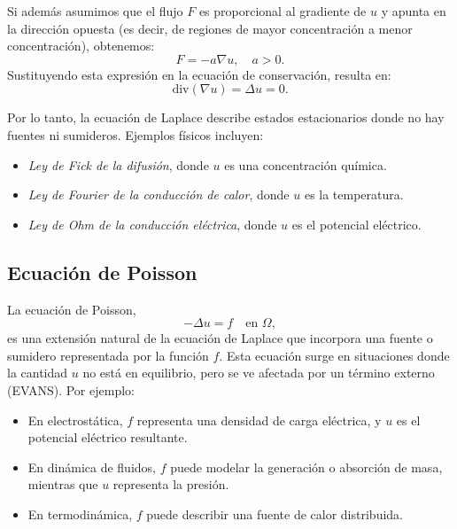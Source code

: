 Si además asumimos que el flujo $F$ es proporcional al gradiente de $u$ y apunta en la dirección opuesta (es decir, de regiones de mayor concentración a menor concentración), obtenemos:
\begin{equation*}
    F = -a \nabla u, \quad a > 0.
\end{equation*}
Sustituyendo esta expresión en la ecuación de conservación, resulta en:
\begin{equation*}
    \text{div}(\nabla u) = \Delta u = 0.
\end{equation*}

Por lo tanto, la ecuación de Laplace describe estados estacionarios donde no hay fuentes ni sumideros. Ejemplos físicos incluyen:
\begin{itemize}
    \item \textit{Ley de Fick de la difusión}, donde $u$ es una concentración química.
    \item \textit{Ley de Fourier de la conducción de calor}, donde $u$ es la temperatura.
    \item \textit{Ley de Ohm de la conducción eléctrica}, donde $u$ es el potencial eléctrico.
\end{itemize}

\subsection{Ecuación de Poisson}

La ecuación de Poisson,
\begin{equation*}
    -\Delta u = f \quad \text{en } \Omega,
\end{equation*}
es una extensión natural de la ecuación de Laplace que incorpora una fuente o sumidero representada por la función $f$. Esta ecuación surge en situaciones donde la cantidad $u$ no está en equilibrio, pero se ve afectada por un término externo (EVANS). Por ejemplo:
\begin{itemize}
    \item En electrostática, $f$ representa una densidad de carga eléctrica, y $u$ es el potencial eléctrico resultante.
    \item En dinámica de fluidos, $f$ puede modelar la generación o absorción de masa, mientras que $u$ representa la presión.
    \item En termodinámica, $f$ puede describir una fuente de calor distribuida.
\end{itemize}


